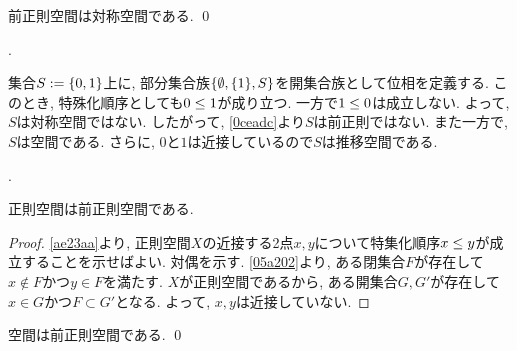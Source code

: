 \documentclass[uplatex, dvipdfmx, a4paper, 12pt, class=jsbook, crop=false]{standalone}
\begin{document}
\begin{proposition}
	\label{0ceadc}
	前正則空間は対称空間である.
	\qed
\end{proposition}

\begin{example}[\Sierpinski 空間]
	\WIP.

	集合\(S \defeq \lrbrace{0, 1}\)上に,
	部分集合族\(\lrbrace{\emptyset, \lrbrace{1}, S}\)を開集合族として位相を定義する.
	このとき, 特殊化順序としても\(0 \leq 1\)が成り立つ.
	一方で\(1 \leq 0\)は成立しない.
	よって, \(S\)は対称空間ではない.
	したがって, \cref{0ceadc}より\(S\)は前正則ではない.
	また一方で, \(S\)は空間である.
	さらに, \(0\)と\(1\)は近接しているので\(S\)は推移空間である.
\end{example}

\begin{example}[推移空間かつ対称空間であるが前正則ではない空間]
	\WIP.
\end{example}

\begin{proposition}
	正則空間は前正則空間である.
\end{proposition}

\begin{proof}
	\cref{ae23aa}より,
	正則空間\(X\)の近接する2点\(x, y\)について特集化順序\(x \leq y\)が成立することを示せばよい.
	対偶を示す.
	\cref{05a202}より,
	ある閉集合\(F\)が存在して\(x \not\in F\)かつ\(y \in F\)を満たす.
	\(X\)が正則空間であるから,
	ある開集合\(G, G'\)が存在して\(x \in G\)かつ\(F \subset G'\)となる.
	よって, \(x, y\)は近接していない.
\end{proof}

\begin{proposition}
	\Hausdorff 空間は前正則空間である.
	\qed
\end{proposition}
\end{document}
